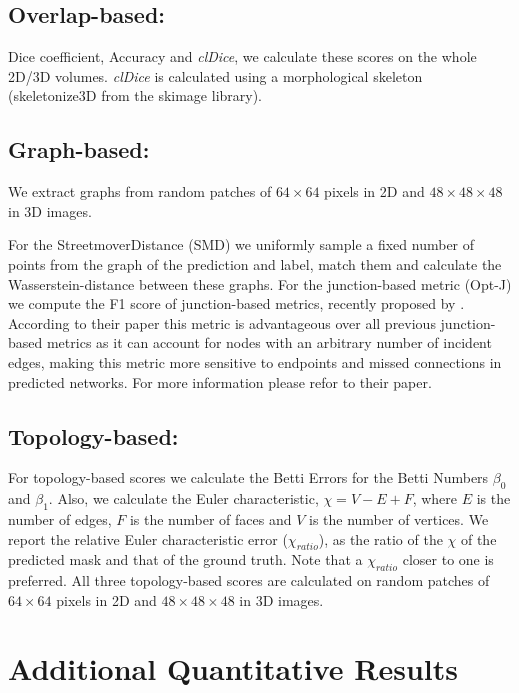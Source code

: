 \subsection{ Overlap-based:}
Dice coefficient, Accuracy and \textit{clDice}, we calculate these scores on the whole 2D/3D volumes. \textit{clDice} is calculated using a morphological skeleton (skeletonize3D from the skimage library). 

\subsection{Graph-based:} We extract graphs 
from random patches of $64\times64$ pixels in 2D and $48\times48\times48$ in 3D images.  

For the StreetmoverDistance (SMD) \cite{belli2019image} we uniformly sample a fixed number of points from the graph of the prediction and label, match them and calculate the Wasserstein-distance between these graphs. 
For the junction-based metric (Opt-J) we compute the F1 score of junction-based metrics, recently proposed by \cite{citrarotowards}. According to their paper this metric is advantageous over all previous junction-based metrics as it can account for nodes with an arbitrary number of incident edges, making this metric more sensitive to endpoints and missed connections in predicted networks. For more information please refor to their paper. 


\subsection{Topology-based:} 
For topology-based scores we calculate the Betti Errors for the Betti Numbers $\beta_0$ and $\beta_1$. Also, we calculate the Euler characteristic, $\chi = V-E+F$, where $E$ is the number of edges, $F$ is the number of faces and $V$ is the number of vertices. We report the relative Euler characteristic error ($\chi_{ratio}$), as the ratio of the $\chi$ of the predicted mask and that of the ground truth. Note that a $\chi_{ratio}$ closer to one is preferred. All three topology-based scores are calculated on random patches of $64\times64$ pixels in 2D and $48\times48\times48$ in 3D images. 




\section{Additional Quantitative Results}

